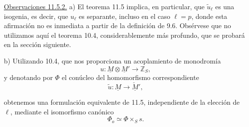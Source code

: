 \medskip
\noindent
\underline{Observaciones 11.5.2.} a) El teorema 11.5 implica, en
particular, que $\widetilde u_\ell$ es una isogenia, es decir, que
$u_\ell$ es separante, incluso en el caso $\ell=p$, donde esta
afirmación no es inmediata a partir de la definición de 9.6. Obsérvese
que no utilizamos aquí el teorema 10.4, considerablemente más profundo,
que se probará en la sección siguiente.

\smallskip
\noindent
b) Utilizando 10.4, que nos proporciona un acoplamiento de monodromía
\begin{equation*}
u:\underline M\otimes\underline M'\longrightarrow\mathbb Z_S,
\end{equation*}
y denotando por $\Phi$ el conúcleo del homomorfismo correspondiente
\begin{equation*}
\widetilde u:\underline M\longrightarrow\underline{\check M}',
\end{equation*}


obtenemos una formulación equivalente de 11.5, independiente de la
elección de $\ell$, mediante el isomorfismo canónico
\begin{equation}\tag{11.5.3}
\Phi_o\simeq\Phi\times_S s.
\end{equation}
